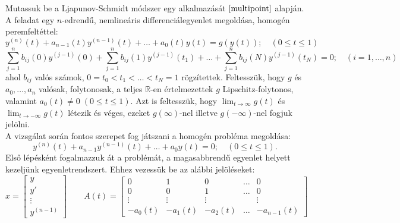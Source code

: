 \documentclass[oneside, titlepage, 12pt, a4paper]{report}
\begin{document}
Mutassuk be a Ljapunov-Schmidt módszer egy alkalmazását $\cite{multipoint}$ alapján. A feladat egy $n$-edrendű, nemlineáris differenciálegyenlet megoldása, homogén peremfeltéttel:
\begin{equation}
y^{(n)}(t) + a_{n-1}(t) y^{(n-1)}(t) + \dots + a_0(t) y(t) = g(y(t)); \quad (0 \leq t \leq 1) \label{eq:mp:inhomOG}
\end{equation}
\begin{equation}
\sum_{j = 1}^n b_{ij}(0) y^{(j-1)}(0) + \sum_{j = 1}^n b_{ij}(1) y^{(j-1)}(t_1) + \dots + \sum_{j = 1}^n b_{ij}(N) y^{(j-1)}(t_N) = 0; \quad (i = 1, \dots, n) \label{eq:mp:boundaryOG}
\end{equation}
ahol $b_{ij}$ valós számok, $0 = t_0 < t_1 < \dots < t_N = 1$ rögzítettek. Feltesszük, hogy $g$ és $a_0, \dots, a_n$ valósak, folytonosak, a teljes $\mathbb{R}$-en értelmezettek $g$ Lipschitz-folytonos, valamint $a_0(t) \neq 0 \; (0 \leq t \leq 1)$. Azt is feltesszük, hogy $\lim_{t \to \infty} g(t)$ és $\lim_{t \to -\infty} g(t)$ létezik és véges, ezeket $g(\infty)$-nel illetve $g(-\infty)$-nel fogjuk jelölni. \\
A vizsgálat során fontos szerepet fog játszani a homogén probléma megoldása:
\begin{equation}
y^{(n)}(t) + a_{n-1} y^{(n-1)}(t) + \dots + a_0 y(t) = 0; \quad (0 \leq t \leq 1) \label{eq:mp:homOG}.
\end{equation}
Első lépésként fogalmazzuk át a problémát, a magasabbrendű egyenlet helyett kezeljünk egyenletrendszert. Ehhez vezessük be az alábbi jelöléseket:
\begin{equation*}
x =
	\begin{bmatrix}
		y \\ y' \\ \vdots \\ y^{(n-1)}
	\end{bmatrix}
\qquad
A(t) =
	\begin{bmatrix}
		0 & 1 & 0 & \dots & 0 \\
		0 & 0 & 1 & \dots & 0 \\
		\vdots & \vdots & \vdots && \vdots \\
		-a_0(t) & -a_1(t) & -a_2(t) & \dots & -a_{n-1}(t)
	\end{bmatrix}
\end{equation*}
\end{document}
